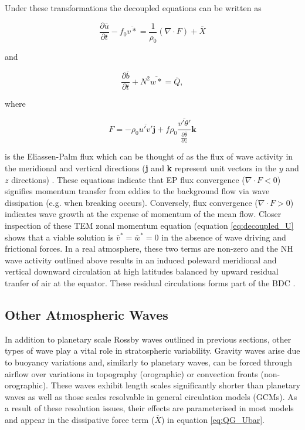 Under these transformations the decoupled equations can be written as

\begin{equation} \label{eq:decoupled_U}
\frac{\partial \overline{u}}{\partial t} - f_0 \overline{v*} = \frac{1}{\rho_0} (\nabla \cdot F) + \overline{X}
\end{equation}

and

\begin{equation} \label{eq:decoupled_b}
\frac{\partial \overline{b}}{\partial t} + N^2 \overline{w*} = \overline{Q},
\end{equation}

where

\begin{equation} \label{eq:EP_flux}
F = -\rho_0 \overline{u'v'}\textbf{j} + f\rho_0\frac{\overline{v'\theta'}}{\frac{\partial{\overline{\theta}}}{\partial{z}}} \textbf{k}
\end{equation}

\noindent is the Eliassen-Palm flux which can be thought of as the flux of wave activity in the meridional and vertical directions (\textbf{j} and \textbf{k} represent unit vectors in the $y$ and $z$ directions) \citep{andrewsPlanetary1976}. These equations indicate that EP flux convergence ($\nabla \cdot F < 0$) signifies momentum transfer from eddies to the background flow via wave dissipation (e.g. when breaking occurs). Conversely, flux convergence ($\nabla \cdot F > 0$) indicates wave growth at the expense of momentum of the mean flow. Closer inspection of these TEM zonal momentum equation (equation \ref{eq:decoupled_U} shows that a viable solution is $\overline{v}^{*} = \overline{w}^{*} = 0$ in the absence of wave driving and frictional forces. In a real atmosphere, these two terms are non-zero and the NH wave activity outlined above results in an induced poleward meridional and vertical downward circulation at high latitudes balanced by upward residual tranfer of air at the equator. These residual circulations forms part of the BDC \citep{butchartBrewerDobson2014}. 

\subsection{Other Atmospheric Waves} \label{sec:other_waves}
In addition to planetary scale Rossby waves outlined in previous sections, other types of wave play a vital role in stratospheric variability. Gravity waves arise due to buoyancy variations and, similarly to planetary waves, can be forced through airflow over variations in topography (orographic) or convection fronts (non-orographic). These waves exhibit length scales significantly shorter than planetary waves as well as those scales resolvable in general circulation models (GCMs). As a result of these resolution issues,  their effects are parameterised in most models and appear in the dissipative force term ($\overline{X}$) in equation \ref{eq:QG_Ubar}.


